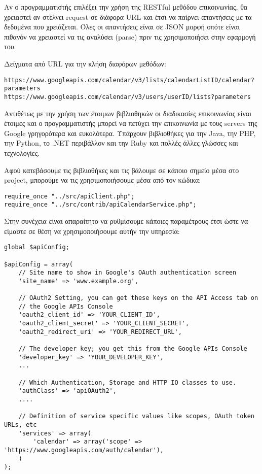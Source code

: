 Αν ο προγραμματιστής επιλέξει την χρήση της RESTful μεθόδου επικοινωνίας, θα χρειαστεί αν στέλνει request σε διάφορα URL και έτσι να παίρνει απαντήσεις με τα δεδομένα που χρειάζεται. Όλες οι απαντήσεις είναι σε JSON μορφή οπότε είναι πιθανόν να χρειαστεί να τις αναλύσει (parse) πριν τις χρησιμοποιήσει στην εφαρμογή του. 

Δείγματα από URL για την κλήση διαφόρων μεθόδων: 

\begin{lstlisting}[breaklines=true]
https://www.googleapis.com/calendar/v3/lists/calendarListID/calendar?parameters
https://www.googleapis.com/calendar/v3/users/userID/lists?parameters
\end{lstlisting}

Αντιθέτως με την χρήση των έτοιμων βιβλιοθηκών οι διαδικασίες επικοινωνίας είναι έτοιμες και ο προγραμματιστής μπορεί να πετύχει την επικοινωνία με τους servers της Google γρηγορότερα και ευκολότερα. 
Υπάρχουν βιβλιοθήκες για την Java, την PHP, την Python, το .NET περιβάλλον και την Ruby και πολλές άλλες γλώσσες και τεχνολογίες. 

Αφού κατεβάσουμε τις βιβλιοθήκες και τις βάλουμε σε κάποιο σημείο μέσα στο project, μπορούμε να τις χρησιμοποιήσουμε μέσα από τον κώδικα:

\begin{lstlisting}
require_once "../src/apiClient.php";
require_once "../src/contrib/apiCalendarService.php";
\end{lstlisting}

Στην συνέχεια είναι απαραίτητο να ρυθμίσουμε κάποιες παραμέτρους έτσι ώστε να είμαστε σε θέση να χρησιμοποιήσουμε αυτήν την υπηρεσία:

\begin{lstlisting}[breaklines=true]
global $apiConfig;

$apiConfig = array(
    // Site name to show in Google's OAuth authentication screen
    'site_name' => 'www.example.org',

    // OAuth2 Setting, you can get these keys on the API Access tab on
    // the Google APIs Console
    'oauth2_client_id' => 'YOUR_CLIENT_ID',
    'oauth2_client_secret' => 'YOUR_CLIENT_SECRET',
    'oauth2_redirect_uri' => 'YOUR_REDIRECT_URL',

    // The developer key; you get this from the Google APIs Console
    'developer_key' => 'YOUR_DEVELOPER_KEY',
    ...

    // Which Authentication, Storage and HTTP IO classes to use.
    'authClass' => 'apiOAuth2',
    ....

    // Definition of service specific values like scopes, OAuth token URLs, etc
    'services' => array(
        'calendar' => array('scope' => 'https://www.googleapis.com/auth/calendar'),
    )
);
\end{lstlisting}

